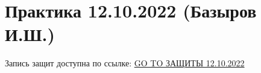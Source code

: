 \documentclass[main.tex]{subfiles}
\begin{document}

\section{Практика 12.10.2022 (Базыров И.Ш.)}

Запись защит доступна по ссылке: \href{https://disk.yandex.ru/d/HeQUisnwV0K5EQ/\%D0\%92\%D1\%82\%D0\%BE\%D1\%80\%D0\%BE\%D0\%B9\%20\%D0\%BA\%D1\%83\%D1\%80\%D1\%81\%20\%D0\%BC\%D0\%B0\%D0\%B3\%D0\%B8\%D1\%81\%D1\%82\%D1\%80\%D0\%B0\%D1\%82\%D1\%83\%D1\%80\%D1\%8B/\%D0\%93\%D0\%B8\%D0\%B4\%D1\%80\%D0\%BE\%D0\%B4\%D0\%B8\%D0\%BD\%D0\%B0\%D0\%BC\%D0\%B8\%D1\%87\%D0\%B5\%D1\%81\%D0\%BA\%D0\%BE\%D0\%B5\%20\%D0\%BC\%D0\%BE\%D0\%B4\%D0\%B5\%D0\%BB\%D0\%B8\%D1\%80\%D0\%BE\%D0\%B2\%D0\%B0\%D0\%BD\%D0\%B8\%D0\%B5/2022_10_12_\%D0\%93\%D0\%94\%D0\%9C_\%D0\%B7\%D0\%B0\%D1\%89\%D0\%B8\%D1\%82\%D1\%8B1.mp4}{GO TO ЗАЩИТЫ 12.10.2022}
\end{document}
